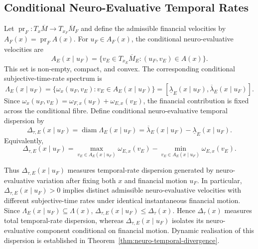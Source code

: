 \documentclass[graybox,natbib]{SNmult}
\providecommand{\1}{}
\renewcommand{\1}{\mathbbm 1}
\begin{document}
\subsection{Conditional Neuro-Evaluative Temporal Rates}
\label{subsec:conditional-neuro-rates}

Let \(\operatorname{pr}_F:T_x\overline M\to T_{x_F}\overline M_F\) and define
the admissible financial velocities by \(A_F(x)=\operatorname{pr}_F A(x)\).
For \(u_F\in A_F(x)\), the conditional neuro-evaluative velocities are
\[
A_E(x\mid u_F)
=
\{v_E\in T_{x_E}\overline M_E:(u_F,v_E)\in A(x)\}.
\]
This set is non-empty, compact, and convex. The corresponding conditional subjective-time-rate spectrum is
\begin{equation}
\Lambda_E(x\mid u_F)
=
\{\omega_x(u_F,v_E):v_E\in A_E(x\mid u_F)\}
=
[\underline\lambda_E(x\mid u_F),
\overline\lambda_E(x\mid u_F)].
\label{eq:conditional-neuro-spectrum}
\end{equation}
Since
\(\omega_x(u_F,v_E)=\omega_{F,x}(u_F)+\omega_{E,x}(v_E)\), the financial
contribution is fixed across the conditional fibre. Define conditional neuro-evaluative temporal dispersion by
\begin{equation}
\Delta_{\tau,E}(x\mid u_F)
=
\operatorname{diam}\Lambda_E(x\mid u_F)
=
\overline\lambda_E(x\mid u_F)
-
\underline\lambda_E(x\mid u_F).
\label{eq:neuro-dispersion}
\end{equation}
Equivalently,
\[
\Delta_{\tau,E}(x\mid u_F)
=
\max_{v_E\in A_E(x\mid u_F)}\omega_{E,x}(v_E)
-
\min_{v_E\in A_E(x\mid u_F)}\omega_{E,x}(v_E).
\]

Thus \(\Delta_{\tau,E}(x\mid u_F)\) measures temporal-rate dispersion generated
by neuro-evaluative variation after fixing both \(x\) and financial motion
\(u_F\). In particular, \(\Delta_{\tau,E}(x\mid u_F)>0\) implies distinct
admissible neuro-evaluative velocities with different subjective-time rates
under identical instantaneous financial motion. Since \(\Lambda_E(x\mid u_F)\subseteq\Lambda(x)\),
\(\Delta_{\tau,E}(x\mid u_F)\leq\Delta_\tau(x)\). Hence
\(\Delta_\tau(x)\) measures total temporal-rate dispersion, whereas
\(\Delta_{\tau,E}(x\mid u_F)\) isolates its neuro-evaluative component
conditional on financial motion. Dynamic realisation of this dispersion is
established in Theorem~\ref{thm:neuro-temporal-divergence}.
\end{document}

